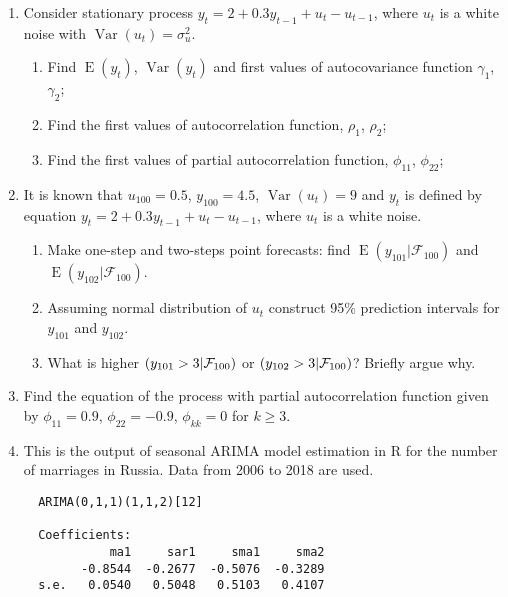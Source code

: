 \documentclass[12pt]{article}
\let\P\relax
\DeclareMathOperator{\P}{\mathbb{P}}
\DeclareMathOperator{\Var}{Var}
\DeclareMathOperator{\E}{E}
\begin{document}
\begin{enumerate}


  \item Consider stationary process $y_t = 2 + 0.3y_{t-1} + u_t - u_{t-1}$, where $u_t$ is a white noise with $\Var(u_t)=\sigma^2_u$.
    \begin{enumerate}
      \item Find $\E(y_t)$, $\Var(y_t)$ and first values of autocovariance function $\gamma_1$, $\gamma_2$;
      \item Find the first values of autocorrelation function, $\rho_1$, $\rho_2$;
      \item Find the first values of partial autocorrelation function, $\phi_{11}$, $\phi_{22}$;
    \end{enumerate}


  \item It is known that $u_{100} = 0.5$, $y_{100}=4.5$, $\Var(u_t)=9$
    and $y_t$ is defined by equation $y_t = 2 + 0.3 y_{t-1} + u_t - u_{t-1}$, where $u_t$ is a white noise.

    \begin{enumerate}
      \item Make one-step and two-steps point forecasts: find $\E(y_{101}|\mathcal{F}_{100})$ and $\E(y_{102}|\mathcal{F}_{100})$.
      \item Assuming normal distribution of $u_t$ construct 95\% prediction intervals for $y_{101}$ and $y_{102}$.
      \item What is higher $\P(y_{101}>3 |\mathcal F_{100})$ or $\P(y_{102}>3 |\mathcal F_{100})$? Briefly argue why.
    \end{enumerate}


\item Find the equation of the process with partial autocorrelation function given by $\phi_{11}=0.9$, $\phi_{22}=-0.9$, $\phi_{kk}=0$ for $k \geq 3$.


\item This is the output of seasonal ARIMA model estimation in R for the number of marriages in Russia.
     Data from 2006 to 2018 are used.
\begin{verbatim}
  ARIMA(0,1,1)(1,1,2)[12]

  Coefficients:
            ma1     sar1     sma1     sma2
        -0.8544  -0.2677  -0.5076  -0.3289
  s.e.   0.0540   0.5048   0.5103   0.4107


\end{verbatim}
\end{enumerate}
\end{document}
